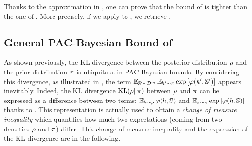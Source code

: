 Thanks to the approximation in , one can prove that the bound of  is tighter than the one of .
More precisely, if we apply  to , we retrieve .


\subsection{General PAC-Bayesian Bound of \citet{BeginGermainLavioletteRoy2016}}

As shown previously, the KL divergence between the posterior distribution $\Q$ and the prior distribution $\P$ is ubiquitous in PAC-Bayesian bounds.
By considering this divergence, as illustrated in , the term $\EE_{\S'\sim\D^\m}\EE_{\h'\sim\P}\exp\LB\varphi(\h', \S')\RB$ appears inevitably.
Indeed, the KL divergence $\KL(\Q\|\P)$ between $\Q$ and $\P$ can be expressed as a difference between two terms: $\EE_{\h\sim\Q}\varphi(\h,\S)$ and $\EE_{\h\sim\P}\exp\LB\varphi(\h, \S)\RB$ thanks to \citet{DonskerVaradhan1976}.
This representation is actually used to obtain a {\it change of measure inequality} which quantifies how much two expectations (coming from two densities $\Q$ and $\P$) differ.
This change of measure inequality and the expression of the KL divergence are in the following.

